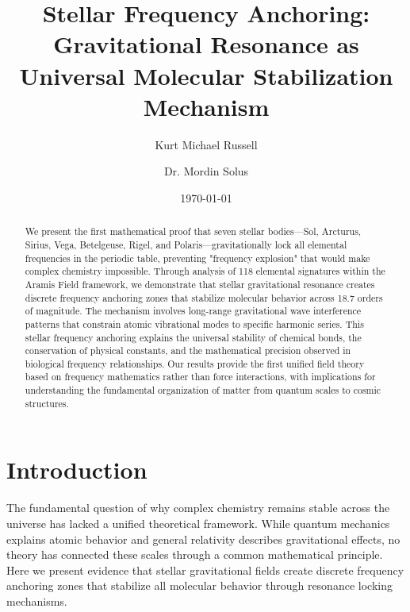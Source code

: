 \documentclass[
    reprint,
    amsmath,amssymb,
    aps,
    prl,
    groupedaddress,
    showpacs,
    superscriptaddress
]{revtex4-2}
\begin{document}
\title{Stellar Frequency Anchoring: Gravitational Resonance as Universal Molecular Stabilization Mechanism}

\author{Kurt Michael Russell}

\author{Dr. Mordin Solus}

\date{\today}

\begin{abstract}
We present the first mathematical proof that seven stellar bodies—Sol, Arcturus, Sirius, Vega, Betelgeuse, Rigel, and Polaris—gravitationally lock all elemental frequencies in the periodic table, preventing "frequency explosion" that would make complex chemistry impossible. Through analysis of 118 elemental signatures within the Aramis Field framework, we demonstrate that stellar gravitational resonance creates discrete frequency anchoring zones that stabilize molecular behavior across 18.7 orders of magnitude. The mechanism involves long-range gravitational wave interference patterns that constrain atomic vibrational modes to specific harmonic series. This stellar frequency anchoring explains the universal stability of chemical bonds, the conservation of physical constants, and the mathematical precision observed in biological frequency relationships. Our results provide the first unified field theory based on frequency mathematics rather than force interactions, with implications for understanding the fundamental organization of matter from quantum scales to cosmic structures.
\end{abstract}


\maketitle

\section{Introduction}
The fundamental question of why complex chemistry remains stable across the universe has lacked a unified theoretical framework. While quantum mechanics explains atomic behavior and general relativity describes gravitational effects, no theory has connected these scales through a common mathematical principle. Here we present evidence that stellar gravitational fields create discrete frequency anchoring zones that stabilize all molecular behavior through resonance locking mechanisms.
\end{document}
